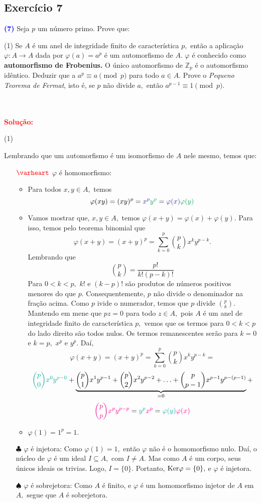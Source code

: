 \documentclass[11pt,a4paper]{article}
\newcommand{\exercicio}[1]{\subsection{Exercício #1} \textcolor{blue}{\bf(#1)}}
\newcommand{\dividiritens}[1]{\begin{tasks}[counter-format={(tsk[a])},label-width=3.6ex, label-format = {\bfseries}, column-sep = {0pt}](1) #1 \end{tasks}}
\newcommand{\pers}[1]{\textcolor{Floresta}{$\negrito{(#1)} $}}
\newcommand{\solucao}[1]{
\textbf{\textcolor{white}{oi}\\ \\ \textcolor{red}{Solução:}} #1}
\begin{document}
\exercicio{7} Seja $p$ um número primo. Prove que:\dividiritens{
\task[\pers{a}] Se $A$ é um anel de integridade finito de característica $p,$ então a aplicação $\varphi \colon A \to A$ dada por $\varphi(a) = a^p$ é um automorfismo de $A.$  $\varphi$ é conhecido como \textbf{automorfismo de Frobenius.}
\task[\pers{b}] O único automorfismo de $\mathbb{Z}_p$ é o automorfismo idêntico. Deduzir que a $a^p \equiv a \pmod p$ para todo $a \in A.$
\task[\pers{c}] Prove o \emph{Pequeno Teorema de Fermat}, isto é, se $p$ não divide $a,$ então $a^{p-1} \equiv 1 \pmod p.$
}
\solucao{
\dividiritens{
\task[\pers{a}]
}
Lembrando que um automorfismo é um isomorfismo de $A$ nele mesmo, temos que:
\begin{itemize}
\item[$\textcolor{red}{\varheart}$] $\varphi$ é homomorfismo:
\begin{itemize}
\item  Para todos $x, y \in A,$ temos 
\[
\varphi(xy) = (xy)^p = \textcolor{Blue}{x^p}\textcolor{Green}{y^p} = \textcolor{Blue}{\varphi(x)}\textcolor{Green}{\varphi(y)}
\]
\item Vamos mostrar que, $x, y \in A,$ temos $\varphi(x+y) = \varphi(x) + \varphi(y).$ Para isso, temos pelo teorema binomial que
\[
\varphi(x + y) = (x+y)^p = \sum\limits_{k=0}^p \binom{p}{k} x^k y^{p-k}.
\]
Lembrando que
\[
\binom{p}{k} = \frac{p!}{k!(p-k)!}
\]
Para $0 < k < p,$ $k!$ e $(k-p)!$ são produtos de números positivos menores do que $p.$ Consequentemente, $p$ não divide o denominador na fração acima. Como $p$ ivide o numerador, temos que $p$ divide $\binom{p}{k}.$ Mantendo em mene que $pz = 0$ para todo $z \in A,$ pois $A$ é um anel de integridade finito de característica $p,$ vemos que os termos para $0 < k< p$ do lado direito são todos nulos. Os termos remanescentes serão para $k = 0$ e $k = p,$ $x^p$ e $y^p.$ Daí,
\[
\varphi(x + y) = (x+y)^p = \sum\limits_{k=0}^p \binom{p}{k} x^k y^{p-k} =\]\[ \textcolor{Emerald}{\binom{p}{0} x^0y^{p-0}} + \underbrace{\binom{p}{1} x^1y^{p-1} + \binom{p}{2} x^2y^{p-2} + \ldots + \binom{p}{p-1} x^{p-1}y^{p-(p-1)}}_{ = 0} + \]\[\textcolor{Magenta}{\binom{p}{p} x^py^{p-p}} = \textcolor{Emerald}{y^p} \textcolor{Magenta}{x^p} = \textcolor{Emerald}{\varphi(y)} \textcolor{Magenta}{\varphi(x)} 
\]

\item $\varphi(1) = 1^p = 1.$
\end{itemize}
\item[$\clubsuit$] $\varphi$ é injetora: Como $\varphi(1) = 1,$ então $\varphi$ não é o homomorfismo nulo. Daí, o núcleo de $\varphi$ é um ideal $I \subseteq A,$ com $I \neq A.$ Mas como $A$ é um corpo, seus únicos ideais os  trivias. Logo, $I = \{ 0 \}.$ Portanto, ${\rm Ker} \varphi = \{ 0 \},$ e $\varphi$ é injetora.
\item[$\spadesuit$] $\varphi$ é sobrejetora: Como $A$ é finito, e $\varphi$ é um homomorfismo injetor de $A$ em $A,$ segue que $A$ é sobrejetora.
\end{itemize}

}
\end{document}
